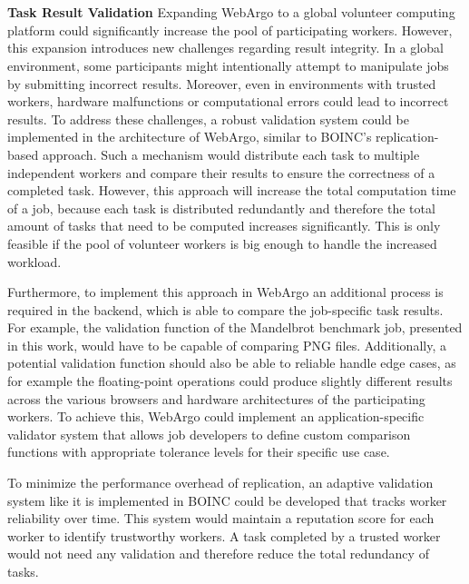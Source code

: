 \\~\\
\textbf{Task Result Validation}
\newline
Expanding WebArgo to a global volunteer computing platform could significantly increase the pool of participating workers. However, this expansion introduces new challenges regarding result integrity. In a global environment, some participants might intentionally attempt to manipulate jobs by submitting incorrect results. Moreover, even in environments with trusted workers, hardware malfunctions or computational errors could lead to incorrect results. To address these challenges, a robust validation system could be implemented in the architecture of WebArgo, similar to \ac{BOINC}'s replication-based approach. Such a mechanism would distribute each task to multiple independent workers and compare their results to ensure the correctness of a completed task. However, this approach will increase the total computation time of a job, because each task is distributed redundantly and therefore the total amount of tasks that need to be computed increases significantly. This is only feasible if the pool of volunteer workers is big enough to handle the increased workload.

Furthermore, to implement this approach in WebArgo an additional process is required in the backend, which is able to compare the job-specific task results. For example, the validation function of the Mandelbrot benchmark job, presented in this work, would have to be capable of comparing \acs{PNG} files. Additionally, a potential validation function should also be able to reliable handle edge cases, as for example the floating-point operations could produce slightly different results across the various browsers and hardware architectures of the participating workers. To achieve this, WebArgo could implement an application-specific validator system that allows job developers to define custom comparison functions with appropriate tolerance levels for their specific use case.   

To minimize the performance overhead of replication, an adaptive validation system like it is implemented in \ac{BOINC} could be developed that tracks worker reliability over time. This system would maintain a reputation score for each worker to identify trustworthy workers. A task completed by a trusted worker would not need any validation and therefore reduce the total redundancy of tasks. 


